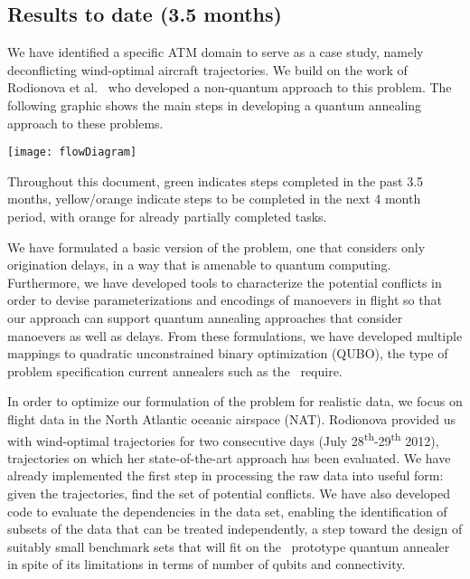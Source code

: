 \subsection*{Results to date (3.5 months)}



We have identified a specific ATM domain to serve as a case study, 
namely deconflicting wind-optimal aircraft trajectories. We build on
the work of Rodionova et al.~\cite{rodionova:16, rodionova:thesis15}
who developed a non-quantum approach to this problem. The following
graphic shows the main steps in developing a quantum annealing approach 
to these problems. 
\begin{minipage}[c]{\columnwidth}
\centering
\texttt{[image: flowDiagram]}
\label{fig:scheme}
\end{minipage}
Throughout this document, green indicates steps
completed in the past 3.5 months, yellow/orange
indicate steps to be completed in the next 4 month period, with orange 
for already partially completed tasks. 

We have formulated a basic version of the problem, one that considers only
origination delays, in a way that is amenable
to quantum computing. Furthermore, we have developed tools to 
characterize the potential
conflicts in order to devise parameterizations and encodings 
of manoevers in flight so that our approach can support quantum annealing
approaches that consider manoevers as well as delays. 
From these formulations, we have developed multiple mappings to 
quadratic unconstrained binary optimization (QUBO), the type of problem
specification current annealers such as the \DW\ require. 

In order to optimize our formulation of the problem for realistic data, we focus
on flight data in the North Atlantic oceanic airspace (NAT). 
Rodionova provided us with
wind-optimal trajectories for two consecutive days (July
28\textsuperscript{th}-29\textsuperscript{th} 2012), trajectories on which her
state-of-the-art approach has been evaluated. 
We have already implemented the first step in processing the raw data
into useful form: given the trajectories, find the set of potential 
conflicts.
We have also developed code to evaluate the dependencies in the data set,
enabling the identification of subsets of the data that can
be treated independently, a step toward the design of suitably small 
benchmark sets that will fit on the \DW\ prototype quantum annealer in spite
of its limitations in terms of number of qubits and connectivity.
